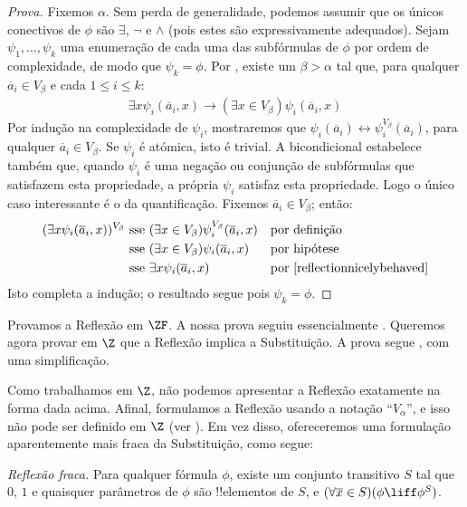 \documentclass[../../../include/open-logic-section]{subfiles}
\begin{document}
\begin{proof}[Prova] 
Fixemos $\alpha$. Sem perda de generalidade, podemos assumir que os únicos conectivos de $\phi$ são $\exists$, $\lnot$ e $\land$ (pois estes são
expressivamente adequados). Sejam $\psi_1, \ldots, \psi_k$ uma enumeração de
cada uma das subfórmulas de $\phi$ por ordem de complexidade, de modo que $\psi_k = \phi$.
Por , existe um $\beta > \alpha$ tal que, para
qualquer $\overline{a}_i \in V_\beta$ e cada $1 \leq i \leq k$:
\begin{align}\label{reflectionnicelybehaved}
	\exists x\psi_i(\overline{a}_i, x) \rightarrow 
	(\exists x \in V_\beta) \psi_i(\overline{a}_i, x)\tag{*}
\end{align}
Por indução na complexidade de $\psi_i$, mostraremos que
$\psi_i(\overline{a}_i) \leftrightarrow
\psi_i^{V_\beta}(\overline{a}_i)$, para qualquer  $\overline{a}_i \in
V_\beta$. 	Se $\psi_i$ é atómica, isto é trivial. A bicondicional
estabelece também que, quando $\psi_i$ é uma negação ou conjunção de
subfórmulas que satisfazem esta propriedade, a própria $\psi_i$ satisfaz esta
propriedade. Logo o único caso interessante é o da quantificação. Fixemos
$\overline{a}_i \in V_\beta$; então:
\begin{align*}
	(\exists x \psi_i(\overline{a}_i, x))^{V_\beta}
	&\text{ sse }
	(\exists x \in V_\beta)\psi_i^{V_\beta}(\overline{a}_i, x)
	&&\text{por definição}\\
	&\text{ sse }
	(\exists x \in V_\beta)\psi_i(\overline{a}_i,  x)
	&&\text{por hipótese}\\
	&\text{ sse }
	\exists x \psi_i(\overline{a}_i, x)
	&&\text{por \eqref{reflectionnicelybehaved}}
\end{align*}
Isto completa a indução; o resultado segue pois $\psi_k = \phi$.
\end{proof}

Provamos a Reflexão em $\ZF$. A nossa prova seguiu essencialmente
\citet{Montague1961}. Queremos agora provar em $\Z$ que a
Reflexão implica a Substituição. A prova segue \citet{Levy1960},
com uma simplificação. 

Como trabalhamos em $\Z$, não podemos apresentar a Reflexão exatamente na
forma dada acima. Afinal, formulamos a Reflexão usando a
notação ``$V_\alpha$'', e isso não pode ser definido em $\Z$ (ver
). Em vez disso, ofereceremos uma formulação
aparentemente mais fraca da Substituição, como segue:

\begin{defish}
\emph{Reflexão fraca.} Para qualquer fórmula $\phi$, existe um conjunto
transitivo $S$ tal que $0$, $1$ e quaisquer parâmetros de $\phi$ são
!!{element}os de $S$, e $(\forall \overline{x} \in S)(\phi \liff
\phi^S)$.
\end{defish}
\end{document}
